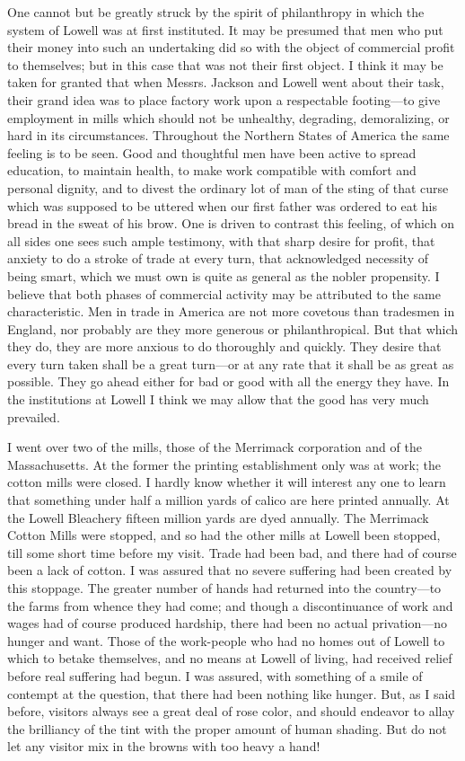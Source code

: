 One cannot but be greatly struck by the spirit of philanthropy in
which the system of Lowell was at first instituted.  It may be
presumed that men who put their money into such an undertaking did
so with the object of commercial profit to themselves; but in this
case that was not their first object.  I think it may be taken for
granted that when Messrs. Jackson and Lowell went about their task,
their grand idea was to place factory work upon a respectable
footing---to give employment in mills which should not be unhealthy,
degrading, demoralizing, or hard in its circumstances.  Throughout
the Northern States of America the same feeling is to be seen.
Good and thoughtful men have been active to spread education, to
maintain health, to make work compatible with comfort and personal
dignity, and to divest the ordinary lot of man of the sting of that
curse which was supposed to be uttered when our first father was
ordered to eat his bread in the sweat of his brow.  One is driven
to contrast this feeling, of which on all sides one sees such ample
testimony, with that sharp desire for profit, that anxiety to do a
stroke of trade at every turn, that acknowledged necessity of being
smart, which we must own is quite as general as the nobler
propensity.  I believe that both phases of commercial activity may
be attributed to the same characteristic.  Men in trade in America
are not more covetous than tradesmen in England, nor probably are
they more generous or philanthropical.  But that which they do,
they are more anxious to do thoroughly and quickly.  They desire
that every turn taken shall be a great turn---or at any rate that it
shall be as great as possible.  They go ahead either for bad or
good with all the energy they have.  In the institutions at Lowell
I think we may allow that the good has very much prevailed.

I went over two of the mills, those of the Merrimack corporation
and of the Massachusetts.  At the former the printing establishment
only was at work; the cotton mills were closed.  I hardly know
whether it will interest any one to learn that something under half
a million yards of calico are here printed annually.  At the Lowell
Bleachery fifteen million yards are dyed annually.  The Merrimack
Cotton Mills were stopped, and so had the other mills at Lowell
been stopped, till some short time before my visit.  Trade had been
bad, and there had of course been a lack of cotton.  I was assured
that no severe suffering had been created by this stoppage.  The
greater number of hands had returned into the country---to the farms
from whence they had come; and though a discontinuance of work and
wages had of course produced hardship, there had been no actual
privation---no hunger and want.  Those of the work-people who had no
homes out of Lowell to which to betake themselves, and no means at
Lowell of living, had received relief before real suffering had
begun.  I was assured, with something of a smile of contempt at the
question, that there had been nothing like hunger.  But, as I said
before, visitors always see a great deal of rose color, and should
endeavor to allay the brilliancy of the tint with the proper amount
of human shading.  But do not let any visitor mix in the browns
with too heavy a hand!

